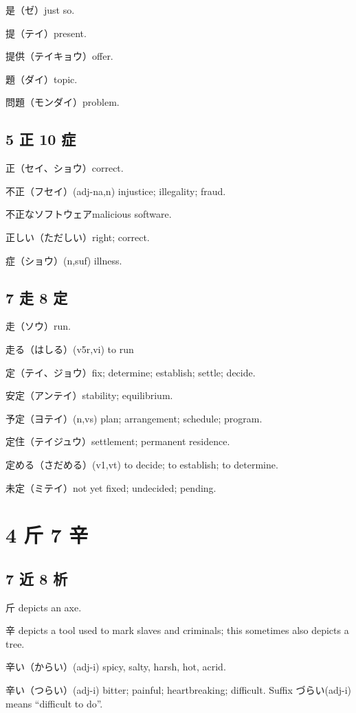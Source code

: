 是（ゼ）just so.

提（テイ）present.

提供（テイキョウ）offer.

題（ダイ）topic.

問題（モンダイ）problem.

\subsection{5 正 10 症}

正（セイ、ショウ）correct.

不正（フセイ）(adj-na,n) injustice; illegality; fraud.

不正なソフトウェアmalicious software.

正しい（ただしい）right; correct.

症（ショウ）(n,suf) illness.

\subsection{7 走 8 定}

走（ソウ）run.

走る（はしる）(v5r,vi) to run

定（テイ、ジョウ）fix; determine; establish; settle; decide.

安定（アンテイ）stability; equilibrium.

予定（ヨテイ）(n,vs) plan; arrangement; schedule; program.

定住（テイジュウ）settlement; permanent residence.

定める（さだめる）(v1,vt) to decide; to establish; to determine.

未定（ミテイ）not yet fixed; undecided; pending.

\section{4 斤 7 辛}

\subsection{7 近 8 析}

斤 depicts an axe.

辛 depicts a tool used to mark slaves and criminals;
this sometimes also depicts a tree.

辛い（からい）(adj-i) spicy, salty, harsh, hot, acrid.

辛い（つらい）(adj-i) bitter; painful; heartbreaking; difficult.
Suffix づらい(adj-i) means ``difficult to do''.

